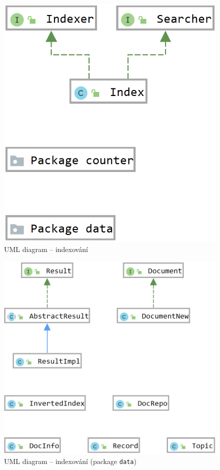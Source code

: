 \documentclass[
11pt,
a4paper,
pdftex,
czech,
titlepage
]{report}
\begin{document}
\begin{figure}[!ht]
	\centering
	\includegraphics[scale=0.35]{img/indexing1.png}
	\caption{UML diagram -- indexování}
	\label{uml_indexing1}
\end{figure}

\begin{figure}[!ht]
	\centering
	\includegraphics[scale=0.35]{img/indexing2.png}
	\caption{UML diagram -- indexování (package \texttt{data})}
	\label{uml_indexing2}
\end{figure}
\end{document}
